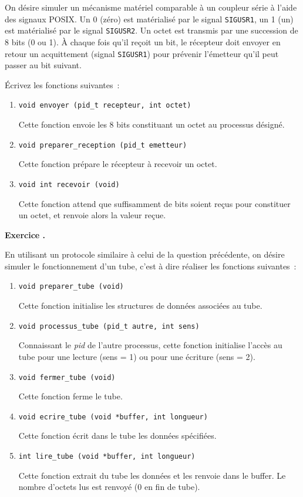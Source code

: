 \documentclass [twoside] {report}
\newcounter {td}
\newcounter {question} [td]
\renewcommand {\thequestion} {\arabic{td}.\arabic {question}}
\newcommand {\question}
    {
        \refstepcounter {question}
        \bigskip
        {\Large\bf Exercice \thequestion} %
        \nopagebreak
        \bigskip

        \nopagebreak
    }
\begin{document}
On désire simuler un mécanisme matériel comparable à un coupleur série
à l'aide des signaux POSIX. Un 0 (zéro) est matérialisé par le signal
{\tt SIGUSR1}, un 1 (un) est matérialisé par le signal {\tt SIGUSR2}.
Un octet est transmis par une succession de 8 bits (0 ou 1).
À chaque fois qu'il reçoit un bit, le récepteur doit envoyer en
retour un acquittement (signal {\tt SIGUSR1}) pour prévenir l'émetteur
qu'il peut passer au bit suivant.

Écrivez les fonctions suivantes~:

\begin {enumerate}
    \item \verb:void envoyer (pid_t recepteur, int octet):

	Cette fonction envoie les 8 bits constituant un octet au
	processus désigné.

    \item \verb:void preparer_reception (pid_t emetteur):

	Cette fonction prépare le récepteur à recevoir un octet.

    \item \verb:void int recevoir (void):

	Cette fonction attend que suffisamment de bits soient reçus
	pour constituer un octet,  et renvoie alors la valeur reçue.

\end {enumerate}


\question

En utilisant un protocole similaire à celui de la question précédente,
on désire simuler le fonctionnement d'un tube, c'est à dire réaliser
les fonctions suivantes~:

\begin {enumerate}
    \item \verb:void preparer_tube (void):

	Cette fonction initialise les structures de données associées
	au tube.

    \item \verb:void processus_tube (pid_t autre, int sens):

	Connaissant le \textit {pid} de l'autre processus, cette
	fonction initialise l'accès au tube pour une lecture (sens
	= 1) ou pour une écriture (sens = 2).

    \item \verb:void fermer_tube (void):

	Cette fonction ferme le tube.

    \item \verb:void ecrire_tube (void *buffer, int longueur):

	Cette fonction écrit dans le tube les données spécifiées.

    \item \verb:int lire_tube (void *buffer, int longueur):

	Cette fonction extrait du tube les données et les renvoie
	dans le buffer. Le nombre d'octets lus est renvoyé (0 en
	fin de tube).

\end {enumerate}
\end{document}
